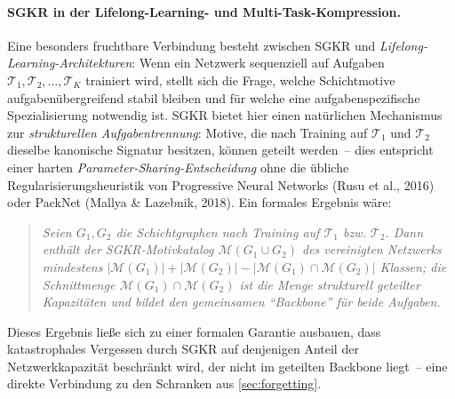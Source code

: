 ﻿\documentclass[12pt, a4paper, openany]{report}
\newcommand{\calM}{\mathcal{M}}
\begin{document}
\paragraph{SGKR in der Lifelong-Learning- und Multi-Task-Kompression.}
Eine besonders fruchtbare Verbindung besteht zwischen SGKR und
\emph{Lifelong-Learning-Architekturen}: Wenn ein Netzwerk sequenziell auf
Aufgaben $\mathcal{T}_1, \mathcal{T}_2, \ldots, \mathcal{T}_K$ trainiert
wird, stellt sich die Frage, welche Schichtmotive aufgabenübergreifend
stabil bleiben und für welche eine aufgabenspezifische Spezialisierung
notwendig ist.  SGKR bietet hier einen natürlichen Mechanismus zur
\emph{strukturellen Aufgabentrennung}: Motive, die nach Training auf
$\mathcal{T}_1$ und $\mathcal{T}_2$ dieselbe kanonische Signatur besitzen,
können geteilt werden~-- dies entspricht einer harten
\emph{Parameter-Sharing-Entscheidung} ohne die übliche Regularisierungs\-heuristik
von Progressive Neural Networks (Rusu et al., 2016) oder PackNet
(Mallya \& Lazebnik, 2018).  Ein formales Ergebnis wäre:
\begin{quote}
\textit{Seien $G_1, G_2$ die Schichtgraphen nach Training auf
$\mathcal{T}_1$ bzw. $\mathcal{T}_2$.  Dann enthält der
SGKR-Motivkatalog $\calM(G_1 \cup G_2)$ des vereinigten Netzwerks
mindestens $|\calM(G_1)| + |\calM(G_2)| - |\calM(G_1) \cap \calM(G_2)|$
Klassen; die Schnittmenge $\calM(G_1) \cap \calM(G_2)$ ist die Menge
strukturell geteilter Kapazitäten und bildet den gemeinsamen ``Backbone''
für beide Aufgaben.}
\end{quote}
Dieses Ergebnis ließe sich zu einer formalen Garantie ausbauen, dass
katastrophales Vergessen durch SGKR auf denjenigen Anteil der
Netzwerkkapazität beschränkt wird, der nicht im geteilten Backbone liegt~--
eine direkte Verbindung zu den Schranken aus \cref{sec:forgetting}.
\end{document}

